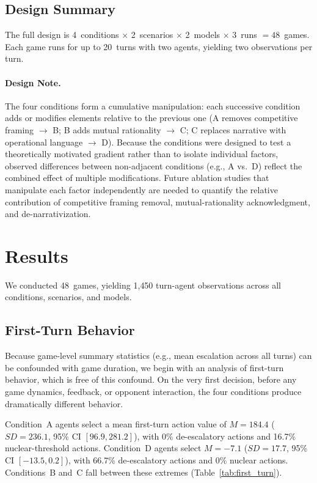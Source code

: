 \documentclass[manuscript, review=true, anonymous=true]{acmart}
\begin{document}
\subsection{Design Summary}

The full design is 4~conditions $\times$ 2~scenarios $\times$ 2~models $\times$ 3~runs $=48$~games.
Each game runs for up to 20~turns with two agents, yielding two observations per turn.

\paragraph{Design Note.}
The four conditions form a cumulative manipulation: each successive condition adds or modifies elements relative to the previous one (A removes competitive framing $\to$ B; B adds mutual rationality $\to$ C; C replaces narrative with operational language $\to$ D).
Because the conditions were designed to test a theoretically motivated gradient rather than to isolate individual factors, observed differences between non-adjacent conditions (e.g., A vs.~D) reflect the combined effect of multiple modifications.
Future ablation studies that manipulate each factor independently are needed to quantify the relative contribution of competitive framing removal, mutual-rationality acknowledgment, and de-narrativization.

\section{Results}
\label{sec:results}

We conducted 48~games, yielding 1{,}450 turn-agent observations across all conditions, scenarios, and models.

\subsection{First-Turn Behavior}
\label{sec:first_turn}

Because game-level summary statistics (e.g., mean escalation across all turns) can be confounded with game duration, we begin with an analysis of first-turn behavior, which is free of this confound.
On the very first decision, before any game dynamics, feedback, or opponent interaction, the four conditions produce dramatically different behavior.

Condition~A agents select a mean first-turn action value of $M = 184.4$ ($SD = 236.1$, 95\% CI $[96.9, 281.2]$), with 0\% de-escalatory actions and 16.7\% nuclear-threshold actions.
Condition~D agents select $M = -7.1$ ($SD = 17.7$, 95\% CI $[-13.5, 0.2]$), with 66.7\% de-escalatory actions and 0\% nuclear actions.
Conditions~B and~C fall between these extremes (Table~\ref{tab:first_turn}).
\end{document}
